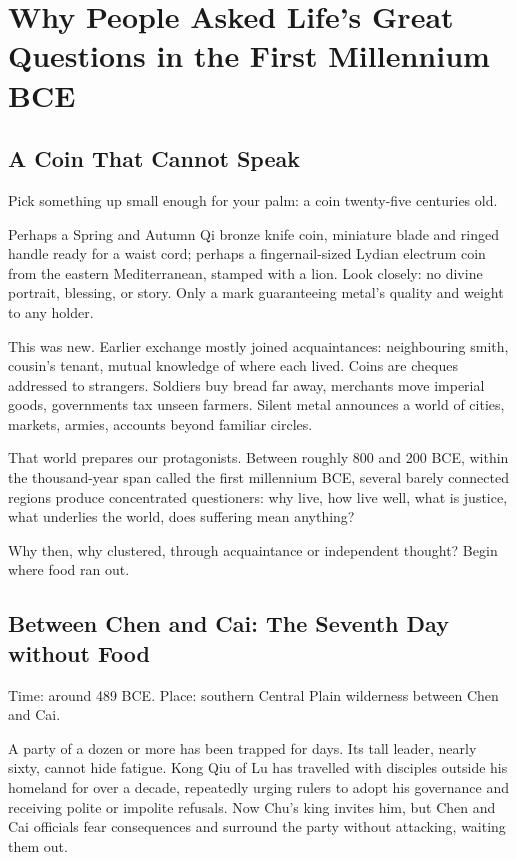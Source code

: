 \chapter[Why Life's Great Questions Clustered]{Why People Asked Life's Great Questions in the First Millennium BCE}
\section{A Coin That Cannot Speak}
Pick something up small enough for your palm: a coin twenty-five centuries old.

Perhaps a Spring and Autumn Qi bronze knife coin, miniature blade and ringed handle ready for a waist cord; perhaps a fingernail-sized Lydian electrum coin from the eastern Mediterranean, stamped with a lion. Look closely: no divine portrait, blessing, or story. Only a mark guaranteeing metal's quality and weight to any holder.

This was new. Earlier exchange mostly joined acquaintances: neighbouring smith, cousin's tenant, mutual knowledge of where each lived. Coins are cheques addressed to strangers. Soldiers buy bread far away, merchants move imperial goods, governments tax unseen farmers. Silent metal announces a world of cities, markets, armies, accounts beyond familiar circles.

That world prepares our protagonists. Between roughly 800 and 200 BCE, within the thousand-year span called the first millennium BCE, several barely connected regions produce concentrated questioners: why live, how live well, what is justice, what underlies the world, does suffering mean anything?

Why then, why clustered, through acquaintance or independent thought? Begin where food ran out.

\section[Between Chen and Cai: Seven Days Hungry]{Between Chen and Cai: The Seventh Day without Food}
Time: around 489 BCE. Place: southern Central Plain wilderness between Chen and Cai.

A party of a dozen or more has been trapped for days. Its tall leader, nearly sixty, cannot hide fatigue. Kong Qiu of Lu has travelled with disciples outside his homeland for over a decade, repeatedly urging rulers to adopt his governance and receiving polite or impolite refusals. Now Chu's king invites him, but Chen and Cai officials fear consequences and surround the party without attacking, waiting them out.

